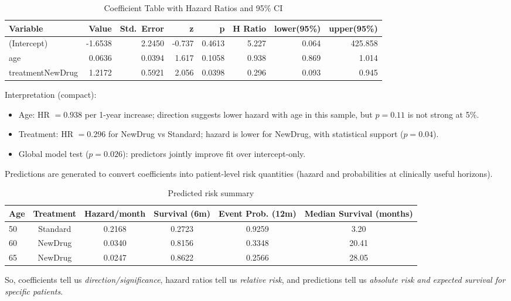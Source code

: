 \documentclass[10pt,a4paper]{article}
\begin{document}
\begin{table}[H]
\centering
\caption{Coefficient Table with Hazard Ratios and 95\% CI}
\begin{tabular}{lrrrrrrr}
\toprule
Variable & Value & Std.\ Error & z & p & H Ratio & lower(95\%) &upper(95\%) \\
\midrule
(Intercept)       & -1.6538 & 2.2450 & -0.737 & 0.4613 & 5.227 & 0.064 & 425.858 \\
age               &  0.0636 & 0.0394 &  1.617 & 0.1058 & 0.938 & 0.869 & 1.014 \\
treatmentNewDrug  &  1.2172 & 0.5921 &  2.056 & 0.0398 & 0.296 & 0.093 & 0.945 \\
\bottomrule
\end{tabular}
\end{table}


Interpretation (compact):
\begin{itemize}
\item Age: HR $=0.938$ per 1-year increase; direction suggests lower hazard with age in this sample, but $p=0.11$ is not strong at 5\%.
\item Treatment: HR $=0.296$ for NewDrug vs Standard; hazard is lower for NewDrug, with statistical support ($p=0.04$).
\item Global model test ($p=0.026$): predictors jointly improve fit over intercept-only.
\end{itemize}

Predictions are generated to convert coefficients into patient-level risk quantities (hazard and probabilities at clinically useful horizons).


\begin{table}[H]
\centering
\caption{Predicted risk summary}
\begin{tabular}{lccccc}
\toprule
Age & Treatment & Hazard/month & Survival (6m) & Event Prob. (12m) & Median Survival (months) \\
\midrule
50 & Standard & 0.2168 & 0.2723 & 0.9259 & 3.20 \\
60 & NewDrug  & 0.0340 & 0.8156 & 0.3348 & 20.41 \\
65 & NewDrug  & 0.0247 & 0.8622 & 0.2566 & 28.05 \\
\bottomrule
\end{tabular}
\end{table}

So, coefficients tell us \emph{direction/significance}, hazard ratios tell us \emph{relative risk}, and predictions tell us \emph{absolute risk and expected survival for specific patients}.
\end{document}
